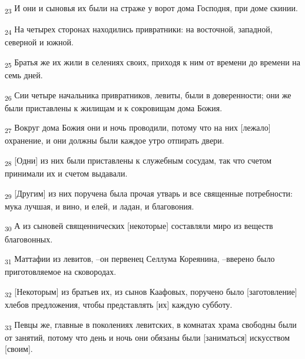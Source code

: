 \begin{tcolorbox}
\textsubscript{23} И они и сыновья их были на страже у ворот дома Господня, при доме скинии.
\end{tcolorbox}
\begin{tcolorbox}
\textsubscript{24} На четырех сторонах находились привратники: на восточной, западной, северной и южной.
\end{tcolorbox}
\begin{tcolorbox}
\textsubscript{25} Братья же их жили в селениях своих, приходя к ним от времени до времени на семь дней.
\end{tcolorbox}
\begin{tcolorbox}
\textsubscript{26} Сии четыре начальника привратников, левиты, были в доверенности; они же были приставлены к жилищам и к сокровищам дома Божия.
\end{tcolorbox}
\begin{tcolorbox}
\textsubscript{27} Вокруг дома Божия они и ночь проводили, потому что на них [лежало] охранение, и они должны были каждое утро отпирать двери.
\end{tcolorbox}
\begin{tcolorbox}
\textsubscript{28} [Одни] из них были приставлены к служебным сосудам, так что счетом принимали их и счетом выдавали.
\end{tcolorbox}
\begin{tcolorbox}
\textsubscript{29} [Другим] из них поручена была прочая утварь и все священные потребности: мука лучшая, и вино, и елей, и ладан, и благовония.
\end{tcolorbox}
\begin{tcolorbox}
\textsubscript{30} А из сыновей священнических [некоторые] составляли миро из веществ благовонных.
\end{tcolorbox}
\begin{tcolorbox}
\textsubscript{31} Маттафии из левитов, --он первенец Селлума Кореянина, --вверено было приготовляемое на сковородах.
\end{tcolorbox}
\begin{tcolorbox}
\textsubscript{32} [Некоторым] из братьев их, из сынов Каафовых, поручено было [заготовление] хлебов предложения, чтобы представлять [их] каждую субботу.
\end{tcolorbox}
\begin{tcolorbox}
\textsubscript{33} Певцы же, главные в поколениях левитских, в комнатах храма свободны были от занятий, потому что день и ночь они обязаны были [заниматься] искусством [своим].
\end{tcolorbox}
